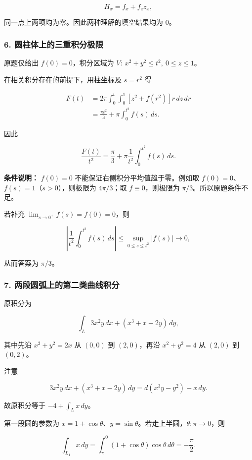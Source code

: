 \documentclass[11pt,fontset=fandol]{ctexart}
\begin{document}
\[
H_x=f_x+f_z z_x,
\]

同一点上两项均为零。因此两种理解的填空结果均为 \(\boxed0\)。

\subsubsection{6.
圆柱体上的三重积分极限}\label{ux5706ux67f1ux4f53ux4e0aux7684ux4e09ux91cdux79efux5206ux6781ux9650}

原题仅给出 \(f(0)=0\)，积分区域为 \(V:\ x^2+y^2\le t^2,\ 0\le z\le1\)。

在相关积分存在的前提下，用柱坐标及 \(s=r^2\) 得

\[
\begin{aligned}
F(t)
&=2\pi\int_0^t\int_0^1[z^2+f(r^2)]r\,dz\,dr\\
&=\frac{\pi t^2}{3}+\pi\int_0^{t^2}f(s)\,ds.
\end{aligned}
\]

因此

\[
\frac{F(t)}{t^2}=\frac\pi3+
\pi\frac1{t^2}\int_0^{t^2}f(s)\,ds.
\]

\textbf{条件说明：} \(f(0)=0\) 不能保证右侧积分平均值趋于零。例如取
\(f(0)=0\)、\(f(s)=1\)（\(s>0\)），则极限为 \(4\pi/3\)；取
\(f\equiv0\)，则极限为 \(\pi/3\)。所以原题条件不足。

若补充 \(\lim_{s\to0^+}f(s)=f(0)=0\)，则

\[
\left|\frac1{t^2}\int_0^{t^2}f(s)\,ds\right|
\le\sup_{0\le s\le t^2}|f(s)|\longrightarrow0,
\]

从而答案为 \(\boxed{\pi/3}\)。

\subsubsection{7.
两段圆弧上的第二类曲线积分}\label{ux4e24ux6bb5ux5706ux5f27ux4e0aux7684ux7b2cux4e8cux7c7bux66f2ux7ebfux79efux5206}

原积分为

\[
\int_L3x^2y\,dx+(x^3+x-2y)\,dy,
\]

其中先沿 \(x^2+y^2=2x\) 从 \((0,0)\) 到 \((2,0)\)，再沿 \(x^2+y^2=4\) 从
\((2,0)\) 到 \((0,2)\)。

注意

\[
3x^2y\,dx+(x^3+x-2y)\,dy=d(x^3y-y^2)+x\,dy.
\]

故原积分等于 \(-4+\int_Lx\,dy\)。

第一段圆的参数为
\(x=1+\cos\theta\)、\(y=\sin\theta\)。若走上半圆，\(\theta:\pi\to0\)，则

\[
\int_{L_1}x\,dy=\int_\pi^0(1+\cos\theta)\cos\theta\,d\theta=-\frac\pi2.
\]
\end{document}
